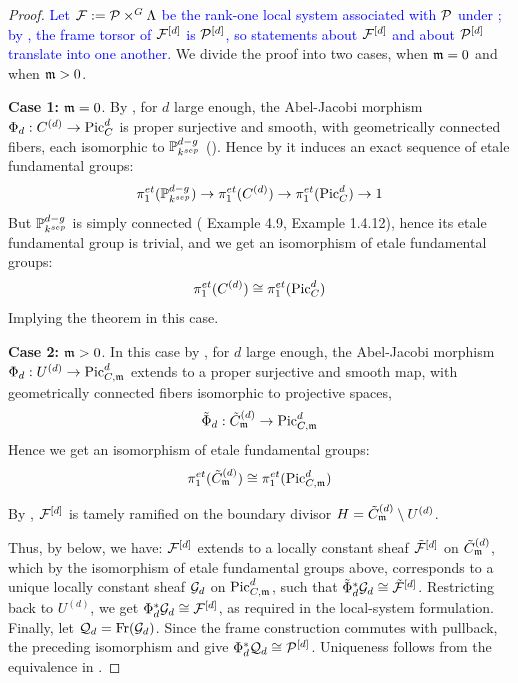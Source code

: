 \begin{proof}
\textcolor{blue}{Let $\cF:=\cP\times^G\Lambda$ be the rank-one local system
associated with $\cP$ under ; by
, the frame torsor of
$\cF^{[d]}$ is $\cP^{[d]}$, so statements about $\cF^{[d]}$ and about
$\cP^{[d]}$ translate into one another.}
We divide the proof into two cases, when $\mdls = 0$ and when $\mdls > 0$.

\textbf{Case 1:} $\mdls = 0$.
By , for $d$ large enough,
the Abel-Jacobi morphism $\Phi_d : C^{(d)} \to \PicC[d]$ is proper surjective and smooth, with geometrically connected fibers,
each isomorphic to $\bP_{k^{sep}}^{d-g}$ ().
Hence by  it induces an exact sequence of etale fundamental groups:
\[ \pi_1^{et}(\bP_{k^{sep}}^{d-g}) \to \pi_1^{et}(C^{(d)}) \to \pi_1^{et}(\PicC[d]) \to 1 \]
But $\bP_{k^{sep}}^{d-g}$  is simply connected (\cite{tendler2015geometricclassfieldtheory} Example 4.9, \cite{Toth2011} Example 1.4.12),
hence its etale fundamental group is trivial, and we get an isomorphism of etale fundamental groups:
$$ \pi_1^{et}(C^{(d)}) \cong \pi_1^{et}(\PicC[d]) $$
Implying the theorem in this case.

\textbf{Case 2:} $\mdls > 0$.
In this case by , for $d$ large enough, the Abel-Jacobi morphism $\Phi_d : U^{(d)} \to \PicCm[d]$
extends to a proper surjective and smooth map, with geometrically connected fibers isomorphic to projective spaces,
$$ \tilde{\Phi}_d : \tilde{C}^{(d)}_\mdls \to \PicCm[d] $$
Hence we get an isomorphism of etale fundamental groups:
$$ \pi_1^{et}(\tilde{C}^{(d)}_\mdls) \cong \pi_1^{et}(\PicCm[d]) $$

By ,
$\cF^{[d]}$ is tamely ramified on the boundary divisor $H = \tilde{C}^{(d)}_\mdls \setminus U^{(d)}$.

Thus, by  below, we have:
$\cF^{[d]}$ extends to a locally constant sheaf $\tilde{\cF}^{[d]}$ on $\tilde{C}^{(d)}_\mdls$,
which by the isomorphism of etale fundamental groups above, corresponds to a unique locally constant sheaf $\cG_d$ on $\PicCm[d]$,
such that $\tilde{\Phi}_d^* \cG_d \cong \tilde{\cF}^{[d]}$.
Restricting back to $U^{(d)}$, we get $\Phi_d^* \cG_d \cong \cF^{[d]}$,
as required in the local-system formulation. Finally, let
$\cQ_d=\operatorname{Fr}(\cG_d)$. Since the frame construction commutes with
pullback, the preceding isomorphism and
 give
$\Phi_d^*\cQ_d\cong\cP^{[d]}$. Uniqueness follows from the equivalence in
.
\end{proof}


